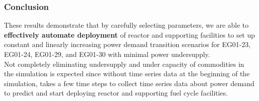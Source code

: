 \begin{frame}
  \frametitle{Conclusion}
        These results demonstrate that by carefully selecting \deploy 
        parameters, we are able to \textbf{effectively automate deployment}
        of reactor and supporting facilities to set up 
        constant and linearly increasing power demand transition scenarios
        for EG01-23, EG01-24, EG01-29, and EG01-30 with minimal 
        power undersupply. 
        \vspace{1em}
        \\
        Not completely eliminating undersupply and under capacity of 
        commodities in the simulation is expected 
        since without time series data 
        at the beginning of the simulation, \deploy takes a few 
        time steps to collect time series data about power demand 
        to predict and start deploying reactor and supporting 
        fuel cycle facilities. 
        
\end{frame}
